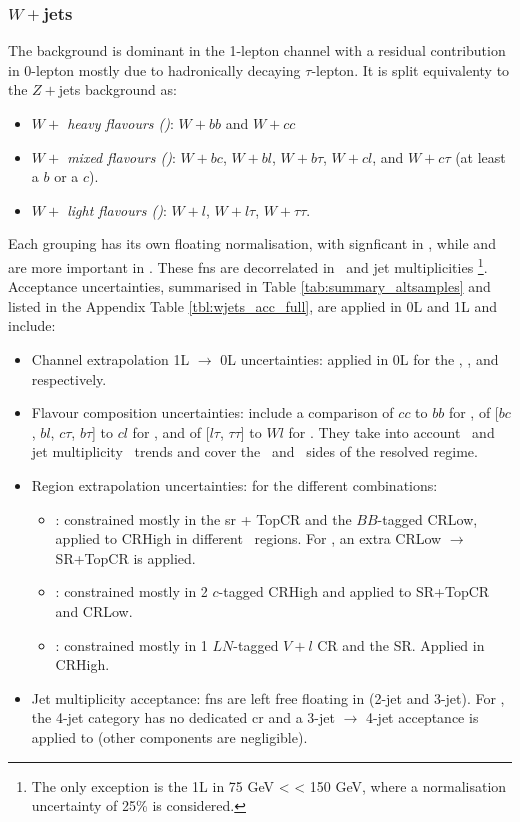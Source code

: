 \subsubsection{$W+$jets}
The background is dominant in the 1-lepton channel with a residual contribution in 0-lepton mostly due to hadronically decaying $\tau$-lepton. It is split equivalenty to the $Z+$jets background as:   
\begin{itemize}
    \item \textit{$W+$ heavy flavours (\whf)}: $W+bb$ and $W+cc$
    \item \textit{$W+$ mixed flavours (\wmf)}: $W+bc$, $W+bl$, $W+b\tau$, $W+cl$, and $W+c\tau$ (at least a $b$ or a $c$).
    \item \textit{$W+$ light flavours (\wlf)}: $W+l$, $W+l\tau$, $W+\tau\tau$.
\end{itemize}
Each grouping has its own floating normalisation, with \whf signficant in \vhb, while \wmf and \wlf are more important in \vhc. These \gls{fn}s are decorrelated in \ptv\ and jet multiplicities \nj\footnote{The only exception is the 1L \wlf in 75 GeV < \ptv < 150 GeV, where a normalisation uncertainty of 25\% is considered.}. Acceptance uncertainties, summarised in Table \ref{tab:summary_altsamples} and listed in the Appendix Table \ref{tbl:wjets_acc_full}, are applied in 0L and 1L and include:
\begin{itemize}[leftmargin=*]
    \item Channel extrapolation 1L $\rightarrow$ 0L uncertainties: applied in 0L for the \whf, \wmf, and \wlf respectively. 
    \item Flavour composition uncertainties: include a comparison of $cc$ to $bb$ for \whf, of [$bc$, $bl$, $c\tau$, $b\tau$] to $cl$ for \wmf, and of [$l\tau$, $\tau\tau$] to $Wl$ for \wlf. They take into account \ptv\ and jet multiplicity \nj\ trends and cover the \vhb\ and \vhc\ sides of the resolved regime. 
    \item Region extrapolation uncertainties: for the different combinations:
    \begin{itemize}
        \item \whf: constrained mostly in the \gls{sr} + TopCR and the $BB$-tagged CRLow, applied to CRHigh in different \ptv\ regions. For \vhb, an extra CRLow $\rightarrow$ SR+TopCR is applied. 
        \item \wmf: constrained mostly in 2 $c$-tagged CRHigh and applied to SR+TopCR and CRLow.
        \item \wlf: constrained mostly in 1 $LN$-tagged $V+l$ CR and the SR. Applied in CRHigh. %
    \end{itemize}
    \item Jet multiplicity \nj acceptance: \gls{fn}s are left free floating in \nj (2-jet and 3-jet). For \vhb, the 4-jet category has no dedicated \gls{cr} and a 3-jet $\rightarrow$ 4-jet acceptance is applied to \whf (other components are negligible).
\end{itemize}

